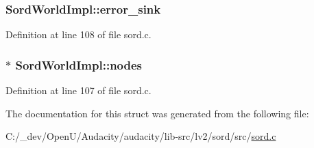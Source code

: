 \subsubsection[{\texorpdfstring{error\+\_\+sink}{error_sink}}]{ Sord\+World\+Impl\+::error\+\_\+sink}\hypertarget{struct_sord_world_impl_a4a82d0c9c003d1fecaef741f5e072c8d}{}\label{struct_sord_world_impl_a4a82d0c9c003d1fecaef741f5e072c8d}


Definition at line 108 of file sord.\+c.

\subsubsection[{\texorpdfstring{nodes}{nodes}}]{$\ast$ Sord\+World\+Impl\+::nodes}\hypertarget{struct_sord_world_impl_a4c4cdcef9843c6fc1f5b6762f847ea2c}{}\label{struct_sord_world_impl_a4c4cdcef9843c6fc1f5b6762f847ea2c}


Definition at line 107 of file sord.\+c.



The documentation for this struct was generated from the following file\+:\begin{DoxyCompactItemize}
\item 
C\+:/\+\_\+dev/\+Open\+U/\+Audacity/audacity/lib-\/src/lv2/sord/src/\hyperlink{sord_8c}{sord.\+c}\end{DoxyCompactItemize}

